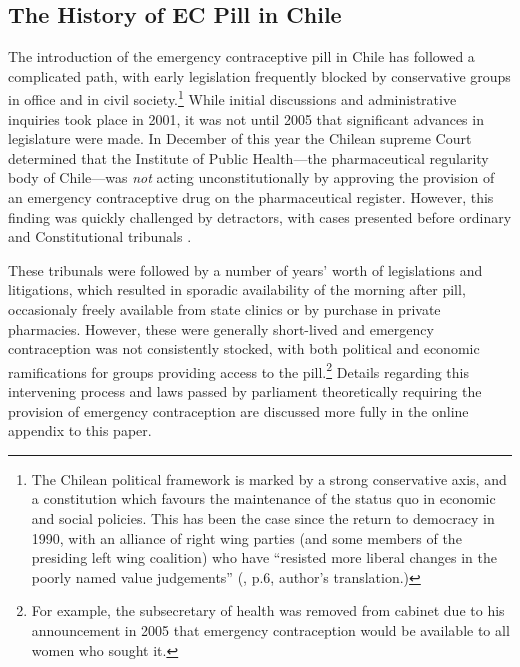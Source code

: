 \subsection{The History of EC Pill in Chile}
\label{TEENsscn:Chile}
The introduction of the emergency contraceptive pill in Chile has followed 
a complicated path, with early legislation frequently blocked by conservative 
groups in office and in civil society.\footnote{The Chilean political 
framework is marked by a strong conservative axis, and a constitution which 
favours the maintenance of the status quo in economic and social policies.  
This has been the case since the return to democracy in 1990, with an 
alliance of right wing parties (and some members of the presiding left wing 
coalition) who have ``resisted more liberal changes in the poorly named value 
judgements''  (\citet{CasasBecerra2008}, p.6, author's translation.)}  While 
initial discussions and administrative inquiries took place in 2001, it was 
not until 2005 that significant advances in legislature were made. In 
December of this year the Chilean supreme Court determined that the Institute 
of Public Health---the pharmaceutical regularity body of Chile---was 
\emph{not} acting unconstitutionally by approving the provision of an 
emergency contraceptive drug on the pharmaceutical register.  However, this 
finding was quickly challenged by detractors, with cases presented before 
ordinary and Constitutional tribunals \citep{CasasBecerra2008}.

These tribunals were followed by a number of years' worth of legislations and
litigations, which resulted in sporadic availability of the morning
after pill, occasionaly freely available from state clinics or by purchase in
private pharmacies.  However, these were generally short-lived and emergency
contraception was not consistently stocked, with both political and economic 
ramifications for groups providing access to the pill.\footnote{For example,
the subsecretary of health was removed from cabinet due to his announcement
in 2005 that emergency contraception would be available to all women who sought
it.}  Details regarding this intervening process and laws passed by parliament
theoretically requiring the provision of emergency contraception are discussed 
more fully in the online appendix to this paper.


